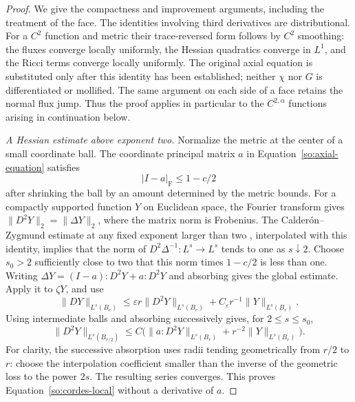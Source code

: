\begin{proof}
We give the compactness and improvement arguments, including the treatment
of the face.  The identities involving third derivatives are distributional.
For a $C^2$ function and metric their trace-reversed form follows by
$C^2$ smoothing: the fluxes converge locally uniformly, the Hessian
quadratics converge in $L^1$, and the Ricci terms converge locally
uniformly.  The original axial equation is substituted only after this
identity has been established; neither $\chi$ nor $G$ is differentiated
or mollified.  The same argument on each side of a face retains the
normal flux jump.  Thus the proof applies in particular to the
$C^{2,\alpha}$ functions arising in continuation below.

\emph{A Hessian estimate above exponent two.}
Normalize the metric at the center of a small coordinate ball.  The
coordinate principal matrix $a$ in Equation~\ref{so:axial-equation}
satisfies
\[
 |I-a|_{\mathrm F}\le1-c/2
\]
after shrinking the ball by an amount determined by the metric bounds.
For a compactly supported function $Y$ on Euclidean space, the Fourier
transform gives
$\|D^2Y\|_2=\|\Delta Y\|_2$, where the matrix norm is Frobenius.
The Calder\'on--Zygmund estimate at any fixed exponent larger than two
\cite[Theorem 9.9]{GilbargTrudinger2001},
interpolated with this identity, implies that the norm of
$D^2\Delta^{-1}:L^s\longrightarrow L^s$ tends to one as $s\downarrow2$.
Choose $s_0>2$ sufficiently close to two that this norm times $1-c/2$
is less than one.  Writing
$\Delta Y=(I-a):D^2Y+a:D^2Y$ and absorbing gives the global estimate.
Apply it to $\zeta Y$, and use
\[
 \|DY\|_{L^s(B_r)}
 \le \varepsilon r\|D^2Y\|_{L^s(B_r)}
       +C_{\varepsilon}r^{-1}\|Y\|_{L^s(B_r)}.
\]
Using intermediate balls and absorbing successively gives, for
$2\le s\le s_0$,
\begin{equation}\label{so:cordes-local}
 \|D^2Y\|_{L^s(B_{r/2})}
 \le C\bigl(\|a:D^2Y\|_{L^s(B_r)}
                +r^{-2}\|Y\|_{L^s(B_r)}\bigr).
\end{equation}
For clarity, the successive absorption uses radii tending geometrically
from $r/2$ to $r$: choose the interpolation coefficient smaller than the
inverse of the geometric loss to the power $2s$.  The resulting series
converges.  This proves Equation~\ref{so:cordes-local} without a derivative
of $a$.


\end{proof}
